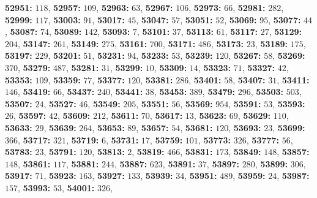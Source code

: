 \textsf{\bfseries 52951:} $118$, \textsf{\bfseries 52957:} $109$, \textsf{\bfseries 52963:} $63$, \textsf{\bfseries 52967:} $106$, \textsf{\bfseries 52973:} $66$, \textsf{\bfseries 52981:} $282$, \textsf{\bfseries 52999:} $117$, \textsf{\bfseries 53003:} $91$, \textsf{\bfseries 53017:} $45$, \textsf{\bfseries 53047:} $57$, \textsf{\bfseries 53051:} $52$, \textsf{\bfseries 53069:} $95$, \textsf{\bfseries 53077:} $44$, \textsf{\bfseries 53087:} $74$, \textsf{\bfseries 53089:} $142$, \textsf{\bfseries 53093:} $7$, \textsf{\bfseries 53101:} $37$, \textsf{\bfseries 53113:} $61$, \textsf{\bfseries 53117:} $27$, \textsf{\bfseries 53129:} $204$, \textsf{\bfseries 53147:} $261$, \textsf{\bfseries 53149:} $275$, \textsf{\bfseries 53161:} $700$, \textsf{\bfseries 53171:} $486$, \textsf{\bfseries 53173:} $23$, \textsf{\bfseries 53189:} $175$, \textsf{\bfseries 53197:} $229$, \textsf{\bfseries 53201:} $51$, \textsf{\bfseries 53231:} $94$, \textsf{\bfseries 53233:} $53$, \textsf{\bfseries 53239:} $120$, \textsf{\bfseries 53267:} $58$, \textsf{\bfseries 53269:} $370$, \textsf{\bfseries 53279:} $487$, \textsf{\bfseries 53281:} $31$, \textsf{\bfseries 53299:} $10$, \textsf{\bfseries 53309:} $14$, \textsf{\bfseries 53323:} $71$, \textsf{\bfseries 53327:} $42$, \textsf{\bfseries 53353:} $109$, \textsf{\bfseries 53359:} $77$, \textsf{\bfseries 53377:} $120$, \textsf{\bfseries 53381:} $286$, \textsf{\bfseries 53401:} $58$, \textsf{\bfseries 53407:} $31$, \textsf{\bfseries 53411:} $146$, \textsf{\bfseries 53419:} $66$, \textsf{\bfseries 53437:} $240$, \textsf{\bfseries 53441:} $38$, \textsf{\bfseries 53453:} $389$, \textsf{\bfseries 53479:} $296$, \textsf{\bfseries 53503:} $503$, \textsf{\bfseries 53507:} $24$, \textsf{\bfseries 53527:} $46$, \textsf{\bfseries 53549:} $205$, \textsf{\bfseries 53551:} $56$, \textsf{\bfseries 53569:} $954$, \textsf{\bfseries 53591:} $53$, \textsf{\bfseries 53593:} $26$, \textsf{\bfseries 53597:} $42$, \textsf{\bfseries 53609:} $212$, \textsf{\bfseries 53611:} $70$, \textsf{\bfseries 53617:} $13$, \textsf{\bfseries 53623:} $69$, \textsf{\bfseries 53629:} $110$, \textsf{\bfseries 53633:} $29$, \textsf{\bfseries 53639:} $264$, \textsf{\bfseries 53653:} $89$, \textsf{\bfseries 53657:} $54$, \textsf{\bfseries 53681:} $120$, \textsf{\bfseries 53693:} $23$, \textsf{\bfseries 53699:} $366$, \textsf{\bfseries 53717:} $321$, \textsf{\bfseries 53719:} $6$, \textsf{\bfseries 53731:} $17$, \textsf{\bfseries 53759:} $101$, \textsf{\bfseries 53773:} $326$, \textsf{\bfseries 53777:} $56$, \textsf{\bfseries 53783:} $23$, \textsf{\bfseries 53791:} $120$, \textsf{\bfseries 53813:} $2$, \textsf{\bfseries 53819:} $466$, \textsf{\bfseries 53831:} $173$, \textsf{\bfseries 53849:} $148$, \textsf{\bfseries 53857:} $148$, \textsf{\bfseries 53861:} $117$, \textsf{\bfseries 53881:} $244$, \textsf{\bfseries 53887:} $623$, \textsf{\bfseries 53891:} $37$, \textsf{\bfseries 53897:} $280$, \textsf{\bfseries 53899:} $306$, \textsf{\bfseries 53917:} $71$, \textsf{\bfseries 53923:} $163$, \textsf{\bfseries 53927:} $133$, \textsf{\bfseries 53939:} $34$, \textsf{\bfseries 53951:} $489$, \textsf{\bfseries 53959:} $24$, \textsf{\bfseries 53987:} $157$, \textsf{\bfseries 53993:} $53$, \textsf{\bfseries 54001:} $326$, 
